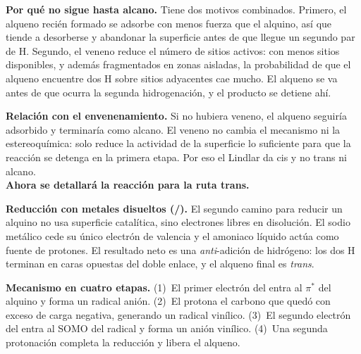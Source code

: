 \textbf{Por qué no sigue hasta alcano.} Tiene dos motivos combinados.
Primero, el alqueno recién formado se adsorbe con menos fuerza que el
alquino, así que tiende a desorberse y abandonar la superficie antes de
que llegue un segundo par de H. Segundo, el veneno reduce el número de
sitios activos: con menos sitios disponibles, y además fragmentados en
zonas aisladas, la probabilidad de que el alqueno encuentre dos H sobre
sitios adyacentes cae mucho. El alqueno se va antes de que ocurra la
segunda hidrogenación, y el producto se detiene ahí.

\textbf{Relación con el envenenamiento.} Si no hubiera veneno, el alqueno
seguiría adsorbido y terminaría como alcano. El veneno no cambia el
mecanismo ni la estereoquímica: solo reduce la actividad de la superficie
lo suficiente para que la reacción se detenga en la primera etapa. Por
eso el Lindlar da cis y no trans ni alcano. \\

\textbf{Ahora se detallará la reacción para la ruta trans.}

\textbf{Reducción con metales disueltos (/).}
El segundo camino para reducir un alquino no usa superficie catalítica,
sino electrones libres en disolución. El sodio metálico cede su único
electrón de valencia y el amoniaco líquido actúa como fuente de protones.
El resultado neto es una \textit{anti}-adición de hidrógeno: los dos H
terminan en caras opuestas del doble enlace, y el alqueno final es
\textit{trans}.

\textbf{Mecanismo en cuatro etapas.}
(1)~El primer electrón del  entra al $\pi^*$ del alquino y forma un
radical anión. (2)~El  protona el carbono que quedó con exceso de
carga negativa, generando un radical vinílico. (3)~El segundo electrón
del  entra al SOMO del radical y forma un anión vinílico.
(4)~Una segunda protonación completa la reducción y libera el alqueno.

